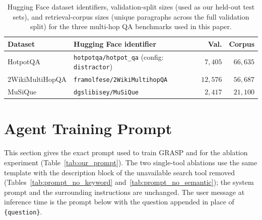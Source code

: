 \documentclass[11pt]{article}
\begin{document}
\begin{table}[h]
\centering
\scriptsize
\setlength{\tabcolsep}{4pt}
\renewcommand{\arraystretch}{1.25}
\begin{tabularx}{\linewidth}{@{}l>{\raggedright\arraybackslash}Xrr@{}}
\toprule
\textbf{Dataset} & \textbf{Hugging Face identifier} & \textbf{Val.} & \textbf{Corpus} \\
\midrule
HotpotQA          & \texttt{hotpotqa/\allowbreak hotpot\_qa} (config: \texttt{distractor}) & $7{,}405$  & $66{,}635$ \\
2WikiMultiHopQA   & \texttt{framolfese/\allowbreak 2WikiMultihopQA}                        & $12{,}576$ & $56{,}687$ \\
MuSiQue           & \texttt{dgslibisey/\allowbreak MuSiQue}                                & $2{,}417$  & $21{,}100$ \\
\bottomrule
\end{tabularx}
\caption{Hugging Face dataset identifiers, validation-split sizes (used as our held-out test sets), and retrieval-corpus sizes (unique paragraphs across the full validation split) for the three multi-hop QA benchmarks used in this paper.}
\label{tab:dataset-sources}
\end{table}

\section{Agent Training Prompt}
\label{app:prompts}

This section gives the exact prompt used to train GRASP and for the ablation experiment (Table~\ref{tab:our_prompt}). The two single-tool ablations use the same template with the description block of the unavailable search tool removed (Tables~\ref{tab:prompt_no_keyword} and~\ref{tab:prompt_no_semantic}); the system prompt and the surrounding instructions are unchanged. The user message at inference time is the prompt below with the question appended in place of \texttt{\{question\}}.
\end{document}
